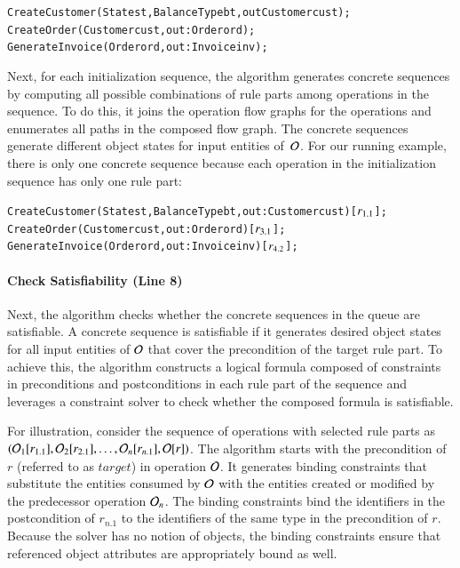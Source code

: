 \vspace*{-4pt}
{\scriptsize
\begin{alltt}
 CreateCustomer(State st, BalanceType bt, out Customer cust);  
 CreateOrder(Customer cust, out: Order ord);
 GenerateInvoice(Order ord, out: Invoice inv);  
\end{alltt}
}
\vspace*{-5pt}

Next, for each initialization sequence, the algorithm generates concrete
sequences by computing all possible combinations of rule parts among operations
in the sequence. To do this, it joins the operation flow graphs for the
operations and enumerates all paths in the composed flow graph. The concrete
sequences generate different object states for input entities of~${\cal O}$. For
our running example, there is only one concrete sequence because each operation
in the initialization sequence has only one rule part:

\vspace*{-4pt}
{\scriptsize
\begin{alltt}
 CreateCustomer(State st, BalanceType bt, out: Customer cust) [\(r\sb{1.1}\)];
 CreateOrder(Customer cust, out: Order ord) [\(r\sb{3.1}\)];	
 GenerateInvoice(Order ord, out: Invoice inv) [\(r\sb{4.2}\)];  
\end{alltt}
}
\vspace*{-5pt}

\vskip -7pt
\paragraph*{Check Satisfiability (Line 8)} Next, the algorithm checks whe\-ther 
the concrete sequences in the queue are satisfiable. A concrete sequence is
satisfiable if it generates desired object states for all input entities of
${\cal O}$ that cover the precondition of the target rule part. To achieve this,
the algorithm constructs a logical formula composed of constraints in
preconditions and postconditions in each rule part of the sequence and leverages
a constraint solver to check whether the composed formula is satisfiable.

For illustration, consider the sequence of operations with selected rule parts
as $({\cal O}_1 [r_{1.1}], {\cal O}_2 [r_{2.1}], \ldots, {\cal O}_n [r_{n.1}],
{\cal O} [r])$.  The algorithm starts with the precondition of $r$ (referred to
as $target$) in operation ${\cal O}$.  It generates binding constraints that
substitute the entities consumed by ${\cal O}$ with the entities created or
modified by the predecessor operation ${\cal O}_n$. The binding constraints bind
the identifiers in the postcondition of $r_{n.1}$ to the identifiers of the same
type in the precondition of $r$. Because the solver has no notion of objects,
the binding constraints ensure that referenced object attributes are
appropriately bound as well.

